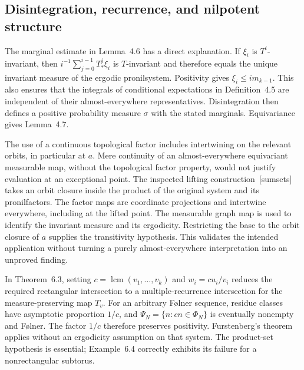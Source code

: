 \documentclass[10pt]{article}
\begin{document}
\subsection*{Disintegration, recurrence, and nilpotent structure}
The marginal estimate in Lemma 4.6 has a direct explanation. If \(\xi_i\) is \(T^i\)-invariant, then \(i^{-1}\sum_{j=0}^{i-1}T_*^j\xi_i\) is \(T\)-invariant and therefore equals the unique invariant measure of the ergodic pronilsystem. Positivity gives \(\xi_i\leq i m_{k-1}\). This also ensures that the integrals of conditional expectations in Definition 4.5 are independent of their almost-everywhere representatives. Disintegration then defines a positive probability measure \(\sigma\) with the stated marginals. Equivariance gives Lemma 4.7.\par
The use of a continuous topological factor includes intertwining on the relevant orbits, in particular at \(a\). Mere continuity of an almost-everywhere equivariant measurable map, without the topological factor property, would not justify evaluation at an exceptional point. The inspected lifting construction [sumsets] takes an orbit closure inside the product of the original system and its pronilfactors. The factor maps are coordinate projections and intertwine everywhere, including at the lifted point. The measurable graph map is used to identify the invariant measure and its ergodicity. Restricting the base to the orbit closure of \(a\) supplies the transitivity hypothesis. This validates the intended application without turning a purely almost-everywhere interpretation into an unproved finding.\par
In Theorem 6.3, setting \(c=\operatorname{lcm}(v_1,\ldots,v_k)\) and \(w_i=cu_i/v_i\) reduces the required rectangular intersection to a multiple-recurrence intersection for the measure-preserving map \(T_v\). For an arbitrary Følner sequence, residue classes have asymptotic proportion \(1/c\), and \(\Psi_N=\{n:cn\in\Phi_N\}\) is eventually nonempty and Følner. The factor \(1/c\) therefore preserves positivity. Furstenberg’s theorem applies without an ergodicity assumption on that system. The product-set hypothesis is essential; Example 6.4 correctly exhibits its failure for a nonrectangular subtorus.\par
\end{document}
